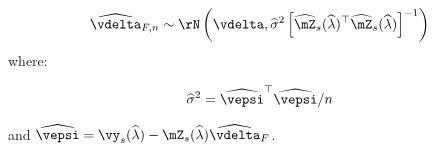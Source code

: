 \documentclass[english,12pt]{book}\usepackage[]{graphicx}\usepackage[]{xcolor}
\begin{document}
\begin{subappendices}
\begin{equation}
  \widehat{\vdelta}_{F, n} \sim \rN\left(\vdelta, \widehat{\sigma}^2\left[\widehat{\mZ}_s(\widehat{\lambda})^\top\widehat{\mZ}_s(\widehat{\lambda})\right]^{-1}\right)
\end{equation}
%
where:

\begin{equation}
  \widehat{\sigma}^2 = \widehat{\vepsi}^\top\widehat{\vepsi} / n
\end{equation}

and $\widehat{\vepsi} = \vy_s(\widehat{\lambda}) - \mZ_{s}(\widehat{\lambda})\widehat{\vdelta}_{F}$.

\end{subappendices}









%


%








%
%
%




\cleardoublepage
{}
\setlength{\columnsep}{0.75cm}
\printindex
\end{document}
